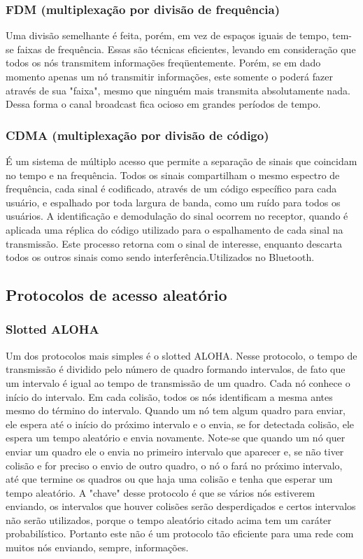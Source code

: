 \documentclass[12pt]{article}
\begin{document}
\subsubsection{FDM (multiplexação por divisão de frequência)}
Uma divisão semelhante é feita, porém, em vez de espaços iguais de tempo, tem-se faixas de frequência. Essas são técnicas eficientes, levando em consideração que todos os nós transmitem informações freqüentemente. Porém, se em dado momento apenas um nó transmitir informações, este somente o poderá fazer através de sua "faixa", mesmo que ninguém mais transmita absolutamente nada. Dessa forma o canal broadcast fica ocioso em grandes períodos de tempo.

\subsubsection{CDMA (multiplexação por divisão de código)}
É um sistema de múltiplo acesso que permite a separação de sinais que coincidam no tempo e na frequência. Todos os sinais compartilham o mesmo espectro de frequência, cada sinal é codificado, através de um código específico para cada usuário, e espalhado por toda largura de banda, como um ruído para todos os usuários. A identificação e demodulação do sinal ocorrem no receptor, quando é aplicada uma réplica do código utilizado para o espalhamento de cada sinal na transmissão. Este processo retorna com o sinal de interesse, enquanto descarta todos os outros sinais como sendo interferência.Utilizados no Bluetooth.


\subsection{Protocolos de acesso aleatório}

\subsubsection{Slotted ALOHA}
Um dos protocolos mais simples é o slotted ALOHA. Nesse protocolo, o tempo de transmissão é dividido pelo número de quadro formando intervalos, de fato que um intervalo é igual ao tempo de transmissão de um quadro. Cada nó conhece o início do intervalo. Em cada colisão, todos os nós identificam a mesma antes mesmo do término do intervalo. Quando um nó tem algum quadro para enviar, ele espera até o início do próximo intervalo e o envia, se for detectada colisão, ele espera um tempo aleatório e envia novamente. Note-se que quando um nó quer enviar um quadro ele o envia no primeiro intervalo que aparecer e, se não tiver colisão e for preciso o envio de outro quadro, o nó o fará no próximo intervalo, até que termine os quadros ou que haja uma colisão e tenha que esperar um tempo aleatório. A "chave" desse protocolo é que se vários nós estiverem enviando, os intervalos que houver colisões serão desperdiçados e certos intervalos não serão utilizados, porque o tempo aleatório citado acima tem um caráter probabilístico. Portanto este não é um protocolo tão eficiente para uma rede com muitos nós enviando, sempre, informações.
\end{document}
